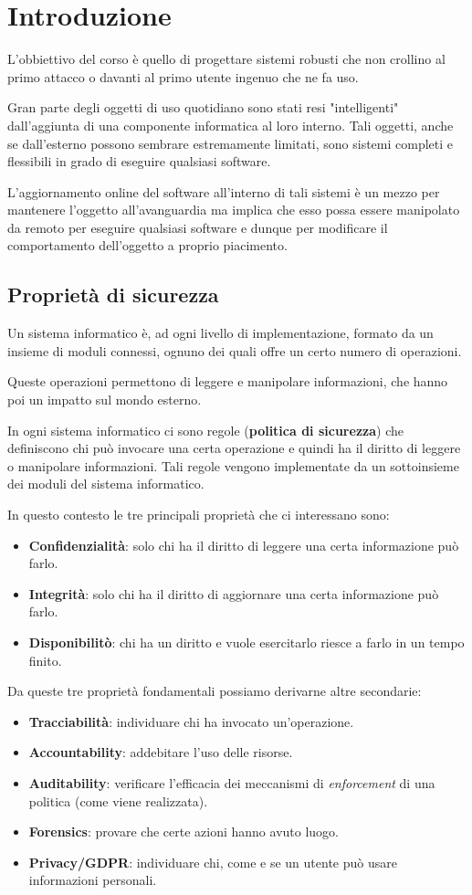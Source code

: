 \chapter{Introduzione}
L'obbiettivo del corso è quello di progettare sistemi robusti che non crollino al primo attacco o davanti al
primo utente ingenuo che ne fa uso.

Gran parte degli oggetti di uso quotidiano sono stati resi "intelligenti" dall'aggiunta di una componente
informatica al loro interno. Tali oggetti, anche se dall'esterno possono sembrare estremamente limitati, sono
sistemi completi e flessibili in grado di eseguire qualsiasi software.

L'aggiornamento online del software all'interno di tali sistemi è un mezzo per mantenere l'oggetto all'avanguardia
ma implica che esso possa essere manipolato da remoto per eseguire qualsiasi software e dunque per modificare
il comportamento dell'oggetto a proprio piacimento.

\section{Proprietà di sicurezza}
Un sistema informatico è, ad ogni livello di implementazione, formato da un insieme di moduli connessi, ognuno dei
quali offre un certo numero di operazioni.

Queste operazioni permettono di leggere e manipolare informazioni, che hanno poi un impatto sul mondo esterno.

In ogni sistema informatico ci sono regole (\textbf{politica di sicurezza}) che definiscono chi può invocare una
certa operazione e quindi ha il diritto di leggere o manipolare informazioni. Tali regole vengono implementate da
un sottoinsieme dei moduli del sistema informatico.

In questo contesto le tre principali proprietà che ci interessano sono:
\begin{itemize}
	\item \textbf{Confidenzialità}: solo chi ha il diritto di leggere una certa informazione può farlo.
	\item \textbf{Integrità}: solo chi ha il diritto di aggiornare una certa informazione può farlo.
	\item \textbf{Disponibilitò}: chi ha un diritto e vuole esercitarlo riesce a farlo in un tempo finito.
\end{itemize}
Da queste tre proprietà fondamentali possiamo derivarne altre secondarie:
\begin{itemize}
	\item \textbf{Tracciabilità}: individuare chi ha invocato un'operazione.
	\item \textbf{Accountability}: addebitare l'uso delle risorse.
	\item \textbf{Auditability}: verificare l'efficacia dei meccanismi di \emph{enforcement} di una politica (come
	      viene realizzata).
	\item \textbf{Forensics}: provare che certe azioni hanno avuto luogo.
	\item \textbf{Privacy/GDPR}: individuare chi, come e se un utente può usare informazioni personali.
\end{itemize}

